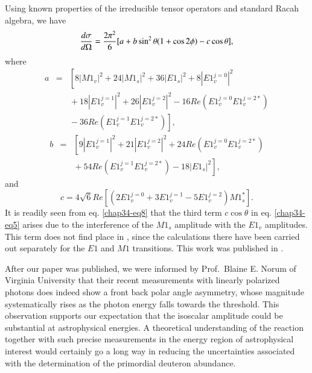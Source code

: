 Using known properties \cite{chap34-key52} of the irreducible tensor operators and
standard Racah algebra, we have
\begin{equation}
{d\sigma \over d\Omega}={2\pi^2 \over 6} [a+b \sin^2\theta (1+\cos 2\phi) -c\cos\theta],\label{chap34-eq5}
\end{equation}
where 
\begin{eqnarray}
a &=& \left[ 8 |M1_v|^2+ 24|M1_s|^2 + 36|E1_s|^2 + 8 |E1_v^{j=0}|^2 \right.\nonumber \\ 
	&&\left.{}+18 |E1_v^{j=1}|^2 + 26 |E1_v^{j=2}|^2 -16 Re\left(E1_v^{j=0} E1_v^{j=2*}\right)\right. \nonumber \\ 
	&&\left.{}-36 Re\left(E1_v^{j=1} E1_v^{j=2*}\right) \right], \label{chap34-eq6}
\end{eqnarray}
\begin{eqnarray}
 b &=& \left[ 9 |E1_v^{j=1}|^2+21 |E1_v^{j=2}|^2 +24 Re\left(E1_v^{j=0} E1_v^{j=2*}\right)\right. \nonumber \\
&&\left.{}+54 Re(E1_v^{j=1} E1_v^{j=2*})-18|E1_s|^2 \right], \label{chap34-eq7}
\end{eqnarray}
and
\begin{equation}
c = 4\sqrt 6 Re \left[(2 E1_v^{j=0} + 3 E1_v^{j=1} -5 E1_v^{j=2})M1_s^*\right] \label{chap34-eq8}.
\end{equation}
It is readily seen from  eq. \eqref{chap34-eq8} that the third term $c \cos\theta$ in eq. \eqref{chap34-eq5} arises due to the interference of the $M1_s$ amplitude with the $E1_v$ amplitudes. This term does not find place in \cite{chap34-key49}, since the calculations there have been carried out separately for the $E1$ and $M1$ transitions.  This work was published in \cite{chap34-key54}.

After our paper was published, we were informed \cite{chap34-key55} by Prof.\ Blaine E. Norum of Virginia University that their recent measurements \cite{chap34-key56} with linearly polarized photons does indeed show a front back polar angle asymmetry, whose magnitude systematically rises as the photon energy falls towards the threshold. This observation supports our expectation that the isoscalar amplitude could be substantial at astrophysical energies. A theoretical understanding of the reaction together with such precise measurements in  the energy region of astrophysical interest  would certainly go a long way in reducing the uncertainties associated with the determination of the primordial deuteron abundance. 

